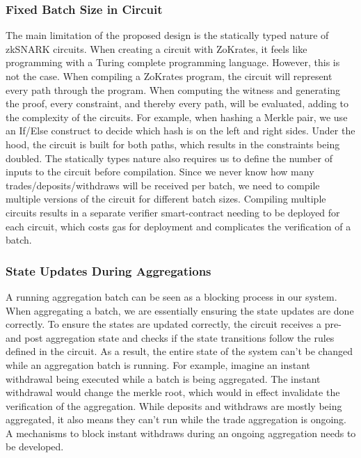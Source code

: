 \documentclass[../../thesis.tex]{subfiles}
\begin{document}
\subsubsection{Fixed Batch Size in Circuit}
The main limitation of the proposed design is the statically typed nature of zkSNARK circuits. When creating a circuit with ZoKrates, it feels like programming with a Turing complete programming language. However, this is not the case. When compiling a ZoKrates program, the circuit will represent every path through the program. When computing the witness and generating the proof, every constraint, and thereby every path, will be evaluated, adding to the complexity of the circuits. For example, when hashing a Merkle pair, we use an If/Else construct to decide which hash is on the left and right sides. Under the hood, the circuit is built for both paths, which results in the constraints being doubled. The statically types nature also requires us to define the number of inputs to the circuit before compilation. Since we never know how many trades/deposits/withdraws will be received per batch, we need to compile multiple versions of the circuit for different batch sizes. Compiling multiple circuits results in a separate verifier smart-contract needing to be deployed for each circuit, which costs gas for deployment and complicates the verification of a batch.

\subsubsection{State Updates During Aggregations}
A running aggregation batch can be seen as a blocking process in our system. When aggregating a batch, we are essentially ensuring the state updates are done correctly. To ensure the states are updated correctly, the circuit receives a pre- and post aggregation state and checks if the state transitions follow the rules defined in the circuit. As a result, the entire state of the system can't be changed while an aggregation batch is running. For example, imagine an instant withdrawal being executed while a batch is being aggregated. The instant withdrawal would change the merkle root, which would in effect invalidate the verification of the aggregation. While deposits and withdraws are mostly being aggregated, it also means they can't run while the trade aggregation is ongoing. A mechanisms to block instant withdraws during an ongoing aggregation needs to be developed. 
\end{document}
